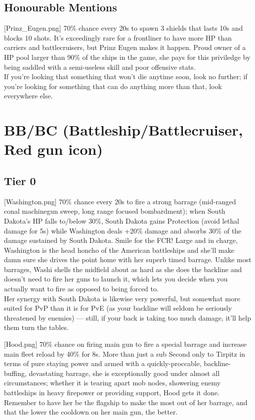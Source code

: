 \newpage
\subsection{Honourable Mentions}
[Prinz_Eugen.png]
{70\% chance every 20s to spawn 3 shields that lasts 10s and blocks 10 shots.}
{}
{It's exceedingly rare for a frontliner to have more HP than carriers and battlecruisers, but Prinz Eugen makes it happen. Proud owner of a HP pool larger than 90\% of the ships in the game, she pays for this priviledge by being saddled with a semi-useless skill and poor offensive stats.\\
If you're looking that something that won't die anytime soon, look no further; if you're looking for something that can do anything more than that, look everywhere else.}

 
\newpage
\section[BB/BC]{BB/BC (Battleship/Battlecruiser, Red gun icon)}
\subsection{Tier 0}
[Washington.png]
{70\% chance every 20s to fire a strong barrage (mid-ranged conal machinegun sweep, long range focused bombardment); when South Dakota's HP falls to/below 30\%, South Dakota gains Protection (avoid lethal damage for 5s) while Washington deals +20\% damage and absorbs 30\% of the damage sustained by South Dakota.}
{Smile for the FCR!}
{Large and in charge, Washington is the head honcho of the American battleships and she'll make damn sure she drives the point home with her superb timed barrage. Unlike most barrages, Washi shells the midfield about as hard as she does the backline and doesn't need to fire her guns to launch it, which lets you decide when you actually want to fire as opposed to being forced to.\\
Her synergy with South Dakota is likewise very powerful, but somewhat more suited for PvP than it is for PvE (as your backline will seldom be seriously threatened by enemies) --- still, if your back is taking too much damage, it'll help them turn the tables.}

[Hood.png]
{70\% chance on firing main gun to fire a special barrage and increase main fleet reload by 40\% for 8s.}
{More than just a sub}
{Second only to Tirpitz in terms of pure staying power and armed with a quickly-proccable, backline-buffing, devastating barrage, she is exceptionally good under almost all circumstances; whether it is tearing apart mob nodes, showering enemy battleships in heavy firepower or providing support, Hood gets it done.\\
Remember to have her be the flagship to make the most out of her barrage, and that the lower the cooldown on her main gun, the better.}

